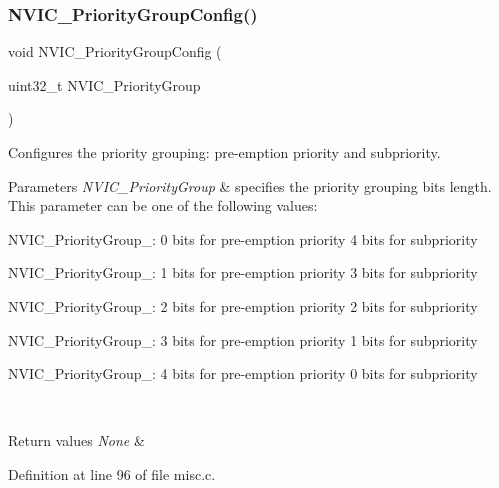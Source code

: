 \subsubsection{\texorpdfstring{N\+V\+I\+C\+\_\+\+Priority\+Group\+Config()}{NVIC\_PriorityGroupConfig()}}
{\footnotesize\ttfamily void N\+V\+I\+C\+\_\+\+Priority\+Group\+Config (\begin{DoxyParamCaption}\item[{uint32\+\_\+t}]{N\+V\+I\+C\+\_\+\+Priority\+Group }\end{DoxyParamCaption})}



Configures the priority grouping\+: pre-\/emption priority and subpriority. 


\begin{DoxyParams}{Parameters}
{\em N\+V\+I\+C\+\_\+\+Priority\+Group} & specifies the priority grouping bits length. This parameter can be one of the following values\+: \begin{DoxyItemize}
\item N\+V\+I\+C\+\_\+\+Priority\+Group\+\_\+: 0 bits for pre-\/emption priority 4 bits for subpriority \item N\+V\+I\+C\+\_\+\+Priority\+Group\+\_\+: 1 bits for pre-\/emption priority 3 bits for subpriority \item N\+V\+I\+C\+\_\+\+Priority\+Group\+\_\+: 2 bits for pre-\/emption priority 2 bits for subpriority \item N\+V\+I\+C\+\_\+\+Priority\+Group\+\_\+: 3 bits for pre-\/emption priority 1 bits for subpriority \item N\+V\+I\+C\+\_\+\+Priority\+Group\+\_\+: 4 bits for pre-\/emption priority 0 bits for subpriority \end{DoxyItemize}
\\
\hline
\end{DoxyParams}

\begin{DoxyRetVals}{Return values}
{\em None} & \\
\hline
\end{DoxyRetVals}


Definition at line 96 of file misc.\+c.

\mbox{\label{group___m_i_s_c___exported___functions_ga1145208ad70edfc2fab19b8b8ef1b1a1}} 
